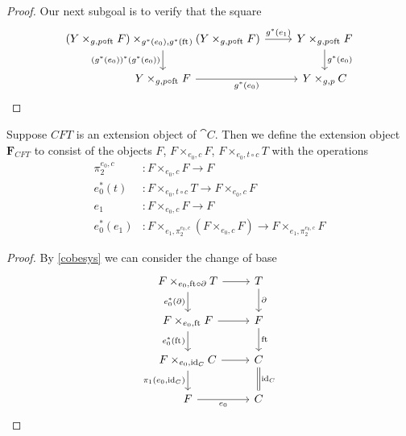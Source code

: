 \begin{proof}
Our next subgoal is to verify that the square
\begin{equation*}
\begin{tikzcd}
\pullback%
  {\pullback{Y}{\stesysf}{g}{p\circ\eft}}%
  {\pullback{Y}{\stesysf}{g}{p\circ\eft}}%
  {g^\ast(\ectxext)}%
  {g^\ast(\eft)}
  \ar{r}{g^\ast(\efamext)} 
  \ar{d}[swap]{(g^\ast(\ectxext))^\ast(g^\ast(\ectxext))} 
  & 
\pullback{Y}{\stesysf}{g}{p\circ\eft}
  \ar{d}{g^\ast(\ectxext)}
  \\
\pullback{Y}{\stesysf}{g}{p\circ\eft}
  \ar{r}[swap]{g^\ast(\ectxext)} 
  & 
\pullback{Y}{\stesysc}{g}{p}
\end{tikzcd}
\end{equation*}
\end{proof}

\begin{defn}
Suppose $CFT$ is an extension object of $\cat{C}$. Then we define the extension object
$\mathbf{F}_{CFT}$ to consist of the objects $F$, $F\times_{e_0,c} F$, $F\times_{e_0,t\circ c} T$
with the operations
\begin{align*}
\pi_2^{e_0,c} & : F\times_{e_0,c} F\to F\\
e_0^\ast(t) & : F\times_{e_0,t\circ c} T\to F\times_{e_0,c} F\\
e_1 & : F\times_{e_0,c} F\to F\\
e_0^\ast(e_1) & : F\times_{e_1,\pi_2^{e_0,c}}(F\times_{e_0,c} F)\to F\times_{e_1,\pi_2^{e_0,c}} F
\end{align*}
\end{defn}

\begin{proof}
By \autoref{cobesys} we can consider the change of base
\begin{equation*}
\begin{tikzcd}
\cobesys{\stesysf}{\stesyst}{\ectxext}{\eft\circ\ebd}
  \ar{r}
  \ar{d}[swap]{\ectxext^\ast(\ebd)}
  &
\stesyst
  \ar{d}{\ebd}
  \\
\cobesys{\stesysf}{\stesysf}{\ectxext}{\eft}
  \ar{r}
  \ar{d}[swap]{\ectxext^\ast(\eft)}
  &
\stesysf
  \ar{d}{\eft}
  \\
\cobesys{\stesysf}{\stesysc}{\ectxext}{\catid{\stesysc}}
  \ar{r}
  \ar{d}[swap]{\pullbackpr{1}{\ectxext}{\catid{\stesysc}}}
  &
\stesysc
  \ar[equals]{d}{\catid{\stesysc}}
  \\
\stesysf \ar{r}[swap]{\ectxext}
  &
\stesysc
\end{tikzcd}
\end{equation*}
\end{proof}

